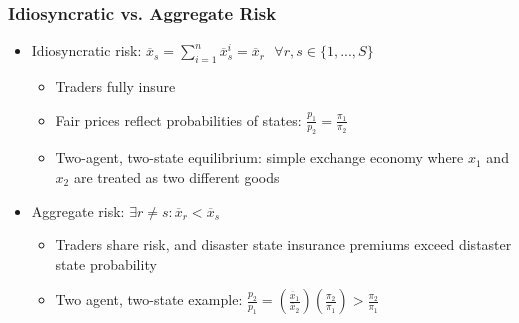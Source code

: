 \documentclass{article}
\newcommand{\olx}{\overline{x}}
\begin{document}
\subsubsection{Idiosyncratic vs. Aggregate Risk }
\begin{itemize}
	\item Idiosyncratic risk: ${\olx_s = \sum_{i=1}^n\olx_s^i=\olx_r \text{ }\forall r,s\in\{1,...,S\}}$
		\begin{itemize}
			\item Traders fully insure
			\item Fair prices reflect probabilities of states: $\frac{p_1}{p_2}=\frac{\pi_1}{\pi_2}$
			\item Two-agent, two-state equilibrium: simple exchange economy where $x_1$ and $x_2$ are treated as two different goods
		\end{itemize}
	\item Aggregate risk: ${\exists r\neq s: \olx_r<\olx_s}$
		\begin{itemize}
			\item Traders share risk, and disaster state insurance premiums exceed distaster state probability 
			\item Two agent, two-state example: ${\frac{p_2}{p_1}=\left(\frac{\olx_1}{\olx_2}\right)\left(\frac{\pi_2}{\pi_1}\right)>\frac{\pi_2}{\pi_1}}$
		\end{itemize}
\end{itemize}
		
\end{document}
